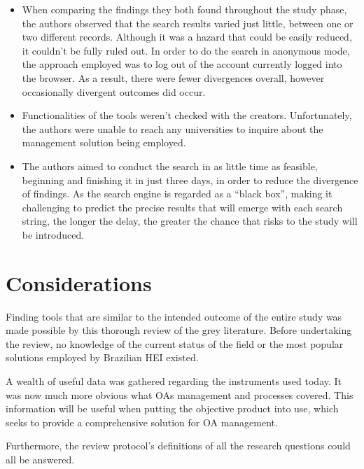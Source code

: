 \begin{itemize}
  \item When comparing the findings they both found throughout the study phase, the authors observed that the search results varied just little, between one or two different records. Although it was a hazard that could be easily reduced, it couldn't be fully ruled out. In order to do the search in anonymous mode, the approach employed was to log out of the account currently logged into the browser. As a result, there were fewer divergences overall, however occasionally divergent outcomes did occur.
  \item Functionalities of the tools weren't checked with the creators. Unfortunately, the authors were unable to reach any universities to inquire about the management solution being employed.
  \item The authors aimed to conduct the search in as little time as feasible, beginning and finishing it in just three days, in order to reduce the divergence of findings. As the search engine is regarded as a ``black box'', making it challenging to predict the precise results that will emerge with each search string, the longer the delay, the greater the chance that risks to the study will be introduced.
\end{itemize}

\section{Considerations}\label{sec:gl-considerations}

Finding tools that are similar to the intended outcome of the entire study was made possible by this thorough review of the grey literature. Before undertaking the review, no knowledge of the current status of the field or the most popular solutions employed by Brazilian \ac{HEI} existed.

A wealth of useful data was gathered regarding the instruments used today. It was now much more obvious what \aclp{OA} management and processes covered. This information will be useful when putting the objective product into use, which seeks to provide a comprehensive solution for \ac{OA} management.

Furthermore, the review protocol's definitions of all the research questions could all be answered.